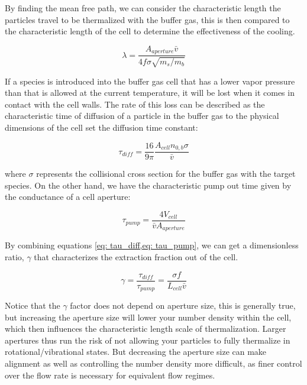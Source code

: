 By finding the mean free path, we can consider the characteristic length the particles travel to be thermalized with the buffer gas, this is then compared to the characteristic length of the cell to determine the effectiveness of the cooling.

\begin{equation*}
	\lambda = \frac{A_{aperture} \bar{v}}{4 f \sigma \sqrt{m_s/m_b}}
\end{equation*}

If a species is introduced into the buffer gas cell that has a lower vapor pressure than that is allowed at the current temperature, it will be lost when it comes in contact with the cell walls. The rate of this loss can be described as the  characteristic time of diffusion of a particle in the buffer gas to the physical dimensions of the cell set the diffusion time constant:

\begin{equation}
	\tau_{diff} = \frac{16}{9 \pi} \frac{A_{cell} n_{0,b} \sigma}{\bar{v}} \label{eq: tau_diff}
\end{equation}

where $\sigma$ represents the collisional cross section for the buffer gas with the target species. On the other hand, we have the characteristic pump out time given by the conductance of a cell aperture:

\begin{equation}
	\tau_{pump}=\frac{4V_{cell}}{\bar{v}A_{aperture}} \label{eq: tau_pump}
\end{equation}

By combining equations \cref{eq: tau_diff,eq: tau_pump}, we can get a dimensionless ratio, $\gamma$ that characterizes the extraction fraction out of the cell.

\begin{equation}
	\gamma = \frac{\tau_{diff}}{\tau_{pump}} = \frac{\sigma f}{L_{cell} \bar{v}} \label{eq: gamma}
\end{equation}

Notice that the $\gamma$ factor does not depend on aperture size, this is generally true, but increasing the aperture size will lower your number density within the cell, which then influences the characteristic length scale of thermalization. Larger apertures thus run the risk of not allowing your particles to fully thermalize in rotational/vibrational states. But decreasing the aperture size can make alignment as well as controlling the number density more difficult, as finer control over the flow rate is necessary for equivalent flow regimes.

